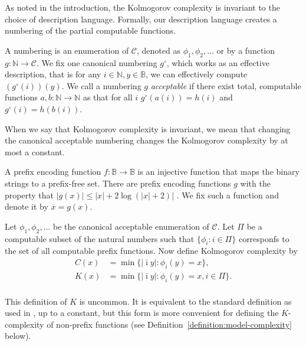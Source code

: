 \documentclass{style/llncs}
\newcommand{\C}{\mathscr C}
\newcommand{\B}{\mathbb B}
\newcommand{\N}{\mathbb N}
\newcommand{\br}[1]{\overline{#1}}
\begin{document}

As noted in the introduction, the Kolmogorov complexity is invariant to the choice of description language. Formally, our description language creates a numbering of the partial computable functions.  

\begin{definition}[Numberings]
A numbering is an enumeration of $\C$, denoted as $\phi_1, \phi_2, \ldots$ or by a function $g: \N \to \C$. We fix one canonical numbering $g^\circ$, which works as an effective description, that is for any $i \in \N, y\in \B$, we can effectively compute $(g^\circ(i))(y)$. We call a numbering $g$ \emph{acceptable} if there exist total, computable functions $a, b: \N \to \N$ as that for all $i$ $g^\circ(a(i)) = h(i)$ and  $g^\circ(i) = h(b(i))$.
\end{definition}

When we say that Kolmogorov complexity is invariant, we mean that changing the canonical acceptable numbering changes the Kolmogorov complexity by at most a constant. 

\begin{definition}
  A prefix encoding function $f:\B\to\B$ is an injective
  function that maps the binary strings to a prefix-free set. There
  are prefix encoding functions $g$ with the property that
  $|g(x)|\le|x|+2\log(|x|+2)|$ \cite{li1993introduction}. We fix such a function and
  denote it by $\br{x}=g(x)$.
\end{definition}

\begin{definition}[Complexity]
Let $\phi_1,\phi_2,\ldots$ be the canonical acceptable enumeration of $\C$. Let $\Pi$ be a computable subset of the natural numbers such that  $\{\phi_i:i\in\Pi\}$ corresponfs to the set of all computable prefix functions. Now define Kolmogorov complexity by
\begin{align*}
C(x)&=\min\{|\bar\imath y|:\phi_i(y)=x\},\\
K(x)&=\min\{|\bar\imath y|:\phi_i(y)=x, i\in\Pi\}.\\
\end{align*}
\end{definition}
This definition of $K$ is uncommon. It is equivalent to the standard definition as used in \cite{li1993introduction}, up to a constant, but this form is more convenient for defining the $K$-complexity of non-prefix functions (see Definition~\ref{definition:model-complexity} below).
\end{document}
